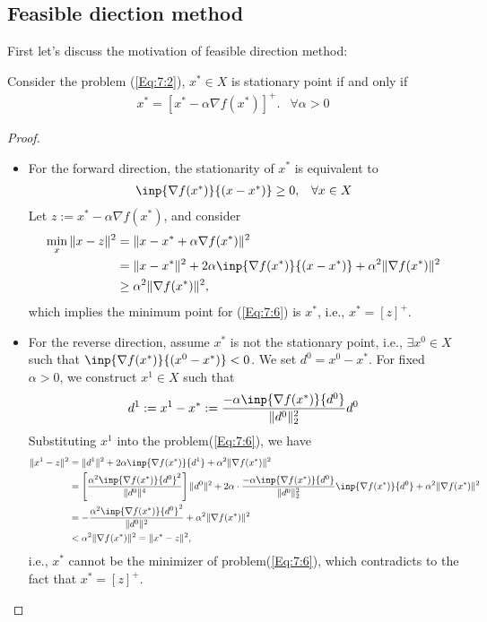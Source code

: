 \subsection{Feasible diection method}
First let's discuss the motivation of feasible direction method:
\begin{proposition}
Consider the problem (\ref{Eq:7:2}), $x^*\in X$ is stationary point if and only if
\[
\begin{array}{ll}
x^*=[x^*-\alpha\nabla f(x^*)]^+.
&
\forall\alpha>0
\end{array}
\]
\end{proposition}
\begin{proof}
\begin{itemize}
\item
For the forward direction, the stationarity of $x^*$ is equivalent to 
\begin{equation}\label{Eq:7:5}
\begin{array}{ll}
\inp{\nabla f(x^*)}{(x-x^*)}\ge0,
&
\forall x\in X
\end{array}
\end{equation}
Let $z:=x^*-\alpha\nabla f(x^*)$, and consider
\begin{subequations}\label{Eq:7:6}
\begin{align}
\min_x\|x-z\|^2&=\|x-x^*+\alpha\nabla f(x^*)\|^2\\
&=\|x-x^*\|^2+2\alpha\inp{\nabla f(x^*)}{(x-x^*)}+\alpha^2\|\nabla f(x^*)\|^2\\
&\ge\alpha^2\|\nabla f(x^*)\|^2,
\end{align}
\end{subequations}
which implies the minimum point for (\ref{Eq:7:6}) is $x^*$, i.e., $x^*=[z]^+$.
\item
For the reverse direction, assume $x^*$ is not the stationary point, i.e., $\exists x^0\in X$ such that $\inp{\nabla f(x^*)}{(x^0-x^*)}<0$. We set $d^0=x^0-x^*$. For fixed $\alpha>0$, we construct $x^1\in X$ such that
\[
d^1:=x^1-x^*:=\frac{-\alpha\inp{\nabla f(x^*)}{d^0}}{\|d^0\|_2^2}d^0
\]
Substituting $x^1$ into the problem(\ref{Eq:7:6}), we have
\begin{align*}
\|x^1-z\|^2&=\|d^1\|^2+2\alpha\inp{\nabla f(x^*)}{d^1}+\alpha^2\|\nabla f(x^*)\|^2\\
&=\left[\frac{\alpha^2\inp{\nabla f(x^*)}{d^0}^2}{\|d^0\|^4}\right]\|d^0\|^2
+2\alpha\cdot\frac{-\alpha\inp{\nabla f(x^*)}{d^0}}{\|d^0\|_2^2}\inp{\nabla f(x^*)}{d^0}+\alpha^2\|\nabla f(x^*)\|^2\\
&=-\frac{\alpha^2\inp{\nabla f(x^*)}{d^0}^2}{\|d^0\|^2}+\alpha^2\|\nabla f(x^*)\|^2\\
&<\alpha^2\|\nabla f(x^*)\|^2=\|x^*-z\|^2,
\end{align*}
i.e., $x^*$ cannot be the minimizer of problem(\ref{Eq:7:6}), which contradicts to the fact that $x^*=[z]^+$.
\end{itemize}

\end{proof}
